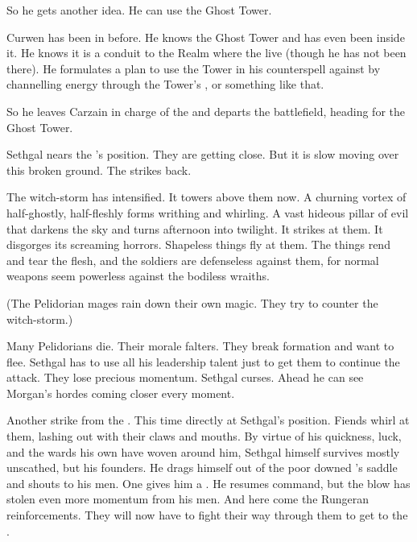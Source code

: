 So he gets another idea. 
He can use the Ghost Tower.

Curwen has been in \Forclin before. 
He knows the Ghost Tower and has even been inside it. 
He knows it is a conduit to the Realm where the \resphain live (though he has not been there). 
He formulates a plan to use the Tower in his counterspell against \Takestsha by channelling energy through the Tower's \nexus, or something like that. 

So he leaves Carzain in charge of the \ishrah and departs the battlefield, heading for the Ghost Tower. 





\begin{comment}
  \subsection{Sethgal gets zapped by the \ishrah}
\end{comment}
\new
Sethgal nears the \ishrah's position. 
They are getting close.
But it is slow moving over this broken ground. 
The \ishrah strikes back. 

The witch-storm has intensified.
It towers above them now.
A churning vortex of half-ghostly, half-fleshly forms writhing and whirling. 
A vast hideous pillar of evil that darkens the sky and turns afternoon into twilight. 
It strikes at them.
It disgorges its screaming horrors. 
Shapeless things fly at them.
The things rend and tear the flesh, and the soldiers are defenseless against them, for normal weapons seem powerless against the bodiless wraiths.

(The Pelidorian \ishrah mages rain down their own magic. They try to counter the witch-storm.)

Many Pelidorians die.
Their morale falters. 
They break formation and want to flee.
Sethgal has to use all his leadership talent just to get them to continue the attack.
They lose precious momentum.
Sethgal curses.
Ahead he can see Morgan's hordes coming closer every moment. 

Another strike from the \ishrah.
This time directly at Sethgal's position. 
Fiends whirl at them, lashing out with their claws and mouths. 
By virtue of his quickness, luck, \armour and the wards his own \ishrah have woven around him, Sethgal himself survives mostly unscathed, but his \relc founders. 
He drags himself out of the poor downed \saurian's saddle and shouts to his men.
One gives him a \relc. 
He resumes command, but the blow has stolen even more momentum from his men. 
And here come the Rungeran reinforcements.
They will now have to fight their way through them to get to the \ishrah. 

